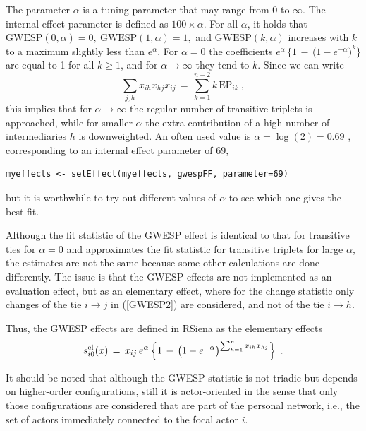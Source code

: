 \documentclass[a4paper,fleqn,11pt]{article}
\newcommand{\+}{\, + \,}
\newcommand{\RS}{{\sf \textsf{RSiena} }}
\newcommand{\vit}{\theenumi}
\begin{document}
\begin{enumerate}
The parameter $\alpha$ is a tuning parameter that may range from 0 to $\infty$.
The internal effect parameter is defined as $100 \times \alpha$.
For all $\alpha$, it holds that
$ \text{GWESP}(0, \alpha) = 0,\  \text{GWESP}(1, \alpha) = 1,$
and $\text{GWESP}(k, \alpha) $ increases with $k$ to a maximum
slightly less than $e^\alpha$.
For $\alpha = 0$ the coefficients
$e^{\alpha} \,\big\{1 \,-\, \big(1 - e^{-\alpha}\big)^k\big\} $
are equal to 1 for all $k \geq 1$,
and for $\alpha \rightarrow \infty$ they tend to $k$.
Since we can write
\[
  \sum_{j,h} x_{ih}x_{hj}x_{ij} \,=\, \sum_{k=1}^{n-2} k\, \text{EP}_{ik}   \ ,
\]
this implies that for $\alpha \rightarrow \infty$  the regular number
of transitive triplets is approached, while for smaller $\alpha$
the extra contribution of a high number of intermediaries $h$
is downweighted.
An often used value is $\alpha = \log(2) = 0.69$ \citep{SPRH06},
corresponding to an internal effect parameter of 69,
\begin{verbatim}
myeffects <- setEffect(myeffects, gwespFF, parameter=69)
\end{verbatim}
but it is worthwhile to try out different values of $\alpha$
to see which one gives the best fit.

Although the fit statistic of the GWESP effect is identical to that
for transitive ties for $\alpha=0$ and approximates the fit
statistic for transitive triplets
for large $\alpha$, the estimates are not the same because some other
calculations are done differently. The issue is that the GWESP effects are
not implemented as an evaluation effect, but as an elementary effect,
where for the change statistic only changes of the tie $i \rightarrow j$ in
(\ref{GWESP2}) are considered, and not of the tie $i \rightarrow h$.

Thus, the GWESP effects are defined in \RS as the elementary effects
\begin{equation}
 s^{\rm el}_{i\vit}(x) \,=\,
       x_{ij} \,
                        e^{\alpha} \,\Big\{1 \,-\, \big(1 -
                        e^{-\alpha}\big)^{\sum_{h=1}^n x_{ih}x_{hj} }  \Big\}
      \,   \ .
         \label{GWESP3}
\end{equation}

It should be noted that although the GWESP statistic is not triadic but
depends on higher-order configurations, still it is actor-oriented
in the sense that only those configurations are considered that are part of the
personal network, i.e., the set of actors immediately connected
to the focal actor $i$.


\end{enumerate}
\end{document}
